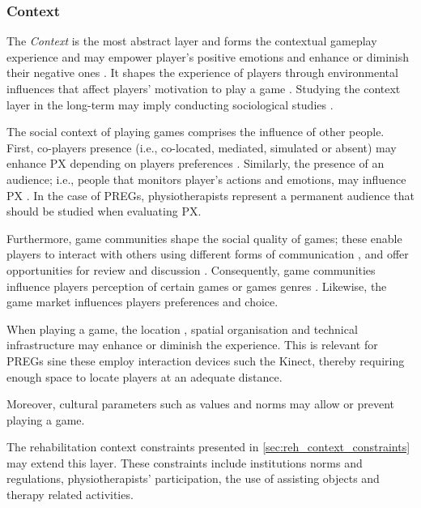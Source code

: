 \subsubsection{Context}

The \textit{Context} is the most abstract layer and forms the contextual gameplay experience and may empower player's positive emotions and enhance or diminish their negative ones \autocite{DeKort2007b}. It shapes the experience of players through environmental influences that affect players' motivation to play a game \autocite{Elson2014}. Studying the context layer in the long-term may imply conducting sociological studies \autocite{Nacked}.

The social context of playing games \autocite{Mayra,DeKort2007b,Elson2014} comprises the influence of other people. First, co-players presence \autocite{Nacked,Nackea2,Nackea,DeKort2007b,Elson2014,Mayra} (i.e., co-located, mediated, simulated or absent) may enhance \ac{PX} depending on players preferences \autocite{DeKort2007b}. Similarly, the presence of an audience; i.e., people that monitors player's actions and emotions, may influence \ac{PX} \autocite{DeKort2007b,Mayra,Nackea2}. In the case of \acp{PREG}, physiotherapists represent a permanent audience that should be studied when evaluating \ac{PX}. 

Furthermore, game communities \autocite{Nacked,Nackea2,Elson2014} shape the social quality of games; these enable players to interact with others using different forms of communication \autocite{Elson2014}, and offer opportunities for review and discussion \autocite{Nacked}. Consequently, game communities influence players perception of certain games or games genres \autocite{Nackea,Nackea2}. Likewise, the game market \autocite{Elson2014,Nackea} influences players preferences and choice.

When playing a game, the location \autocite{Engl2013,Elson2014}, spatial organisation \autocite{DeKort2007b} and technical infrastructure \autocite{Elson2014} may enhance or diminish the experience. This is relevant for \acp{PREG} sine these employ interaction devices such the Kinect, thereby requiring enough space to locate players at an adequate distance.

Moreover, cultural parameters such as values and norms \autocite{Elson2014,Mayra} may allow or prevent playing a game.

The rehabilitation context constraints presented in \autoref{sec:reh_context_constraints} may extend this layer. These constraints include institutions norms and regulations, physiotherapists' participation, the use of assisting objects and therapy related activities.

